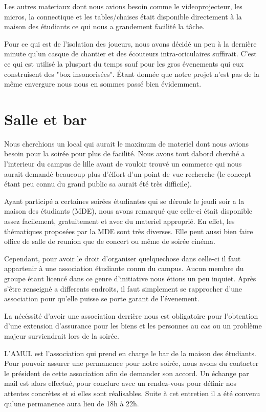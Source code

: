 Les autres materiaux dont nous avions besoin comme le videoprojecteur,
les micros, la connectique et les tables/chaises était disponible directement à
la maison des étudiants ce qui nous a grandement facilité la tâche.

Pour ce qui est de l'isolation des joueurs, nous avons décidé un peu à
la dernière minute qu'un casque de chantier et des écouteurs
intra-oriculaires suffirait. C'est ce qui est utilisé la pluspart du
temps sauf pour les gros évenements qui eux construisent des "box
insonorisées". Étant donnée que notre projet n'est pas de la même
envergure nous nous en sommes passé bien évidemment.

\section{Salle et bar}%
\label{sec:salle_et_bar}

Nous cherchions un local qui aurait le maximum de materiel dont nous
avions besoin pour la soirée pour plus de facilité. Nous avons tout
dabord cherché a l'interieur du campus de lille avant de vouloir trouvé
un commerce qui nous aurait demandé beaucoup plus d'éffort d'un point de
vue recherche (le concept étant peu connu du grand public sa aurait été
très difficile).

Ayant participé a certaines soirées étudiantes qui se déroule le jeudi
soir a la maison des étudiants (MDE), nous avons remarqué que celle-ci
était disponible assez facilement, gratuitement et avec du materiel
approprié. En effet, les thématiques proposées par la MDE sont très
diverses. Elle peut aussi bien faire office de salle de reunion que de
concert ou même de soirée cinéma.

Cependant, pour avoir le droit d'organiser quelquechose dans celle-ci il
faut appartenir à une association étudiante connu du campus. Aucun
membre du groupe étant licencé dans ce genre d'initiative nous étions un
peu inquiet. Après s'être renseigné a differents endroits, il faut
simplement se rapprocher d'une association pour qu'elle puisse se porte
garant de l'évenement.

La nécéssité d'avoir une association derrière nous est obligatoire pour
l'obtention d'une extension d'assurance pour les biens et les personnes
au cas ou un problème majeur surviendrait lors de la soirée.

L'AMUL est l'association qui prend en charge le bar de la maison des
étudiants.  Pour pouvoir assurer une permanence pour notre soirée, nous
avons du contacter le président de cette association afin de demander
son accord.  Un échange par mail est alors effectué, pour conclure avec
un rendez-vous pour définir nos attentes concrètes et si elles sont
réalisables. Suite à cet entretien il a été convenu qu'une permanence
aura lieu de 18h à 22h.

